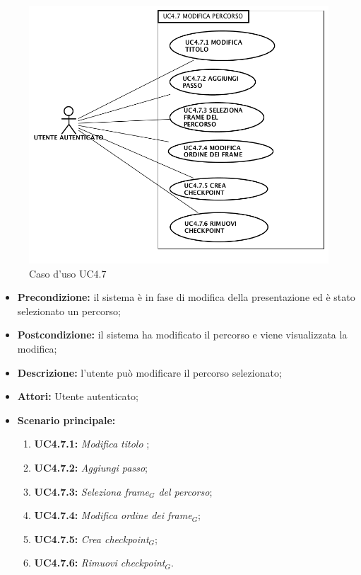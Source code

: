 \begin{figure}[H]
	\begin{center}
	\includegraphics[scale=0.4]{diagram/UC4-7.png}
	\caption{Caso d'uso UC4.7}
	\end{center}
\end{figure}
\begin{itemize}
	\item \textbf{Precondizione:} il sistema è in fase di modifica della presentazione ed è stato selezionato un percorso;
	\item \textbf{Postcondizione:} il sistema ha modificato il percorso e viene visualizzata la modifica;
	\item \textbf{Descrizione:} l'utente può modificare il percorso selezionato;
	\item \textbf{Attori:} Utente autenticato;
	\item \textbf{Scenario principale:}
	\begin{enumerate}
		\item \textbf{ UC4.7.1:} \textit{ Modifica titolo };
		\item \textbf{ UC4.7.2:} \textit{ Aggiungi passo};
		\item \textbf{ UC4.7.3:} \textit{ Seleziona frame$_G$ del percorso};
		\item \textbf{ UC4.7.4:} \textit{ Modifica ordine dei frame$_G$};
		\item \textbf{ UC4.7.5:} \textit{ Crea checkpoint$_G$};
		\item \textbf{ UC4.7.6:} \textit{ Rimuovi checkpoint$_G$}.
	\end{enumerate}
\end{itemize}
